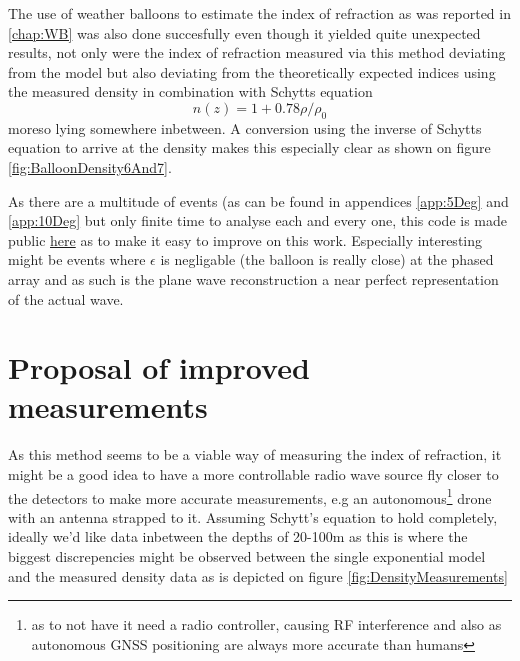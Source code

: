 \documentclass[11pt,a4paper,faculty=we,language=en,doctype=report]{cls/ugent-doc}
\begin{document}
The use of weather balloons to estimate the index of refraction as
was reported in \ref{chap:WB} was also done succesfully even though
it yielded quite unexpected results, not only were the index of
refraction measured via this method deviating from the model but
also deviating from the theoretically expected indices using the
measured density in combination with Schytts equation
\begin{equation}
	n(z) = 1+ 0.78\rho/\rho_0
\end{equation}
moreso lying somewhere inbetween. A conversion using the inverse of
Schytts equation to arrive at the density makes this especially
clear as shown on figure \ref{fig:BalloonDensity6And7}.

As there are a multitude of events (as can be found in appendices
\ref{app:5Deg} and \ref{app:10Deg} but only finite time to analyse
each and every one, this code is made public
\href{https://github.com/arthuradriaens-code/projects-mt.git}{here}
as to make it easy to improve on this work.  Especially interesting
might be events where $\epsilon$ is negligable (the balloon is
really close) at the phased array and as such is the plane wave
reconstruction a near perfect representation of the actual wave.
\section*{Proposal of improved measurements}
As this method seems to be a viable way of measuring the index of refraction,
it might be a good idea to have a more controllable radio wave source fly
closer to the detectors to make more accurate measurements, e.g an
autonomous\footnote{as to not have it need a radio controller, causing RF
interference and also as autonomous GNSS positioning are always more
accurate than humans} drone with an antenna strapped to it.  Assuming Schytt's
equation to hold completely, ideally we'd like data inbetween the depths of
20-100m as this is where the biggest discrepencies might be observed between
the single exponential model and the measured density data as is depicted on
figure \ref{fig:DensityMeasurements} 

\appendix
\end{document}

